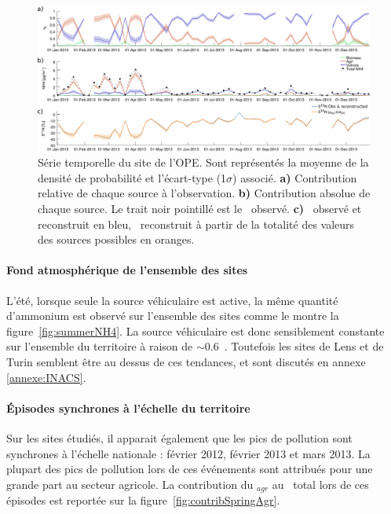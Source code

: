 \begin{figure}[ht]
    \centering
    \includegraphics[width=1.0\linewidth]{figures/INACS/MCA_OPE_S3-BioFerVeh_e-30_timeSerie2013.pdf}
    \caption{Série temporelle du site de l'OPE. Sont représentés la moyenne de la densité
        de probabilité et l'écart-type (1$\sigma$) associé. \textbf{a)} Contribution relative
        de chaque source à l'observation. \textbf{b)} Contribution absolue de chaque source. Le
        trait noir pointillé est le \NHq~observé. \textbf{c)} \dN~observé et reconstruit en bleu,
        \dN~reconstruit à partir de la totalité des valeurs des sources possibles en oranges.
    }
    \label{fig:timeSerieOPE}
\end{figure}

\paragraph{Fond atmosphérique de l'ensemble des sites}
L'été, lorsque seule la source véhiculaire est active, la même quantité d'ammonium est
observé sur l'ensemble des sites comme le montre la figure~\ref{fig:summerNH4}.
La source véhiculaire est donc sensiblement constante sur l'ensemble du territoire à
raison de $\sim0.6$~\si{\ugm}.
Toutefois les sites de Lens et de Turin semblent être au dessus de ces tendances, et sont
discutés en annexe \ref{annexe:INACS}.

\paragraph{Épisodes synchrones à l'échelle du territoire}
Sur les sites étudiés, il apparait également que les pics de pollution sont synchrones à
l'échelle nationale : février 2012, février 2013 et mars 2013.
La plupart des pics de pollution lors de ces événements sont attribués pour une grande
part au secteur agricole.
La contribution du \NHq$_{agr}$ au \NHq~total lors de ces épisodes est reportée sur la
figure~\ref{fig:contribSpringAgr}.

